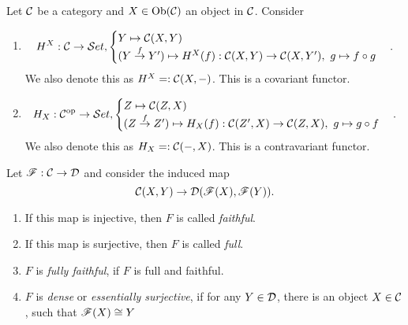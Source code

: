 \begin{bsp}
  Let $\mathcal{C}$ be a category and $X\in \text{Ob}(\mathcal{C})$ an object in $\mathcal{C}$. Consider
  \begin{enumerate}
    \item
    \[
    H^{X}:\mathcal{C}\to \mathcal{S}et,\begin{cases}Y\mapsto \mathcal{C}(X,Y)\\ (Y\overset{f}{\to}Y')\mapsto H^X(f): \mathcal{C}(X,Y)\to \mathcal{C}(X,Y'),~g\mapsto f\circ g\end{cases}.
    \] We also denote this as $H^X=:\mathcal{C}(X,\mathrm{-})$. \coms This is a covariant functor.\come
    \item
    \[H_X:\mathcal{C}^{\mathrm{op}}\to \mathcal{S}et,\begin{cases}Z\mapsto \mathcal{C}(Z,X)\\ (Z\overset{f}{\to}Z')\mapsto H_X(f): \mathcal{C}(Z',X)\to \mathcal{C}(Z,X),~g\mapsto g\circ f\end{cases}.
    \]
    We also denote this as $H_X=:\mathcal{C}(\mathrm{-},X)$. \coms This is a contravariant functor.\come
  \end{enumerate}
\end{bsp}
\begin{defn}
  Let $\mathscr{F}:\mathcal{C}\to \mathcal{D}$ and consider the induced map
  \[
  \mathcal{C}(X,Y)\to \mathcal{D}(\mathscr{F}(X),\mathscr{F}(Y)).
  \]
  \begin{enumerate}
    \item If this map is injective, then $F$ is called \emph{faithful}.
    \item If this map is surjective, then $F$ is called \emph{full}.
    \item $F$ is \emph{fully faithful}, if $F$ is full and faithful.
    \item $F$ is \emph{dense}  or \emph{essentially surjective}, if for any $Y\in \mathcal{D}$, there is an object $X\in \mathcal{C}$, such that $\mathscr{F}(X)\cong Y$
  \end{enumerate}
\end{defn}

